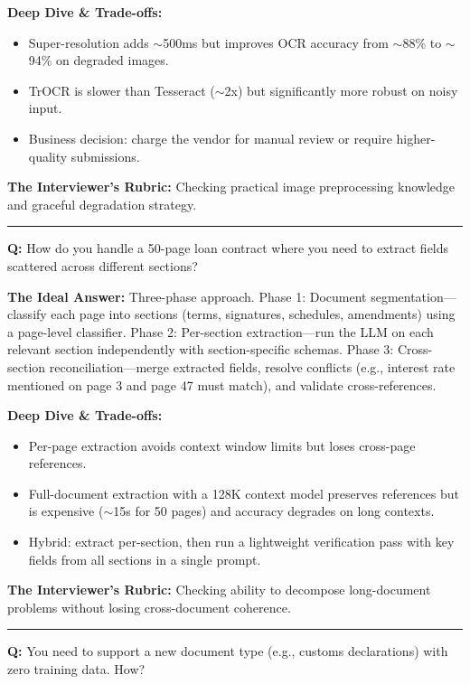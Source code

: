 \textbf{Deep Dive \& Trade-offs:}
\begin{itemize}
  \item Super-resolution adds $\sim$500ms but improves OCR accuracy from $\sim$88\% to $\sim$94\% on degraded images.
  \item TrOCR is slower than Tesseract ($\sim$2x) but significantly more robust on noisy input.
  \item Business decision: charge the vendor for manual review or require higher-quality submissions.
\end{itemize}

\textbf{The Interviewer's Rubric:} Checking practical image preprocessing knowledge and graceful degradation strategy.

\bigskip\hrule\bigskip

\textbf{Q:} How do you handle a 50-page loan contract where you need to extract fields scattered across different sections?

\textbf{The Ideal Answer:} Three-phase approach. Phase 1: Document segmentation---classify each page into sections (terms, signatures, schedules, amendments) using a page-level classifier. Phase 2: Per-section extraction---run the LLM on each relevant section independently with section-specific schemas. Phase 3: Cross-section reconciliation---merge extracted fields, resolve conflicts (e.g., interest rate mentioned on page 3 and page 47 must match), and validate cross-references.

\textbf{Deep Dive \& Trade-offs:}
\begin{itemize}
  \item Per-page extraction avoids context window limits but loses cross-page references.
  \item Full-document extraction with a 128K context model preserves references but is expensive ($\sim$15s for 50 pages) and accuracy degrades on long contexts.
  \item Hybrid: extract per-section, then run a lightweight verification pass with key fields from all sections in a single prompt.
\end{itemize}

\textbf{The Interviewer's Rubric:} Checking ability to decompose long-document problems without losing cross-document coherence.

\bigskip\hrule\bigskip

\textbf{Q:} You need to support a new document type (e.g., customs declarations) with zero training data. How?

